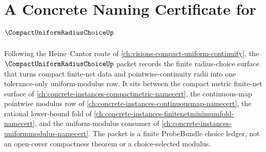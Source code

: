\chapter{A Concrete Naming Certificate for $\CompactUniformRadiusChoiceUp$}
\label{ch:concrete-instances-compact-uniform-radius-choice-namecert}

Following the Heine--Cantor route of \autoref{ch:visions-compact-uniform-continuity}, the $\CompactUniformRadiusChoiceUp$ packet records the finite radius-choice surface that turns compact finite-net data and pointwise-continuity radii into one tolerance-only uniform-modulus row. It sits between the compact metric finite-net surface of \autoref{ch:concrete-instances-compactmetric-namecert}, the continuous-map pointwise modulus row of \autoref{ch:concrete-instances-continuousmap-namecert}, the rational lower-bound fold of \autoref{ch:concrete-instances-finitenetminimumfold-namecert}, and the uniform-modulus consumer of \autoref{ch:concrete-instances-uniformmodulus-namecert}. The packet is a finite ProbeBundle choice ledger, not an open-cover compactness theorem or a choice-selected modulus.

